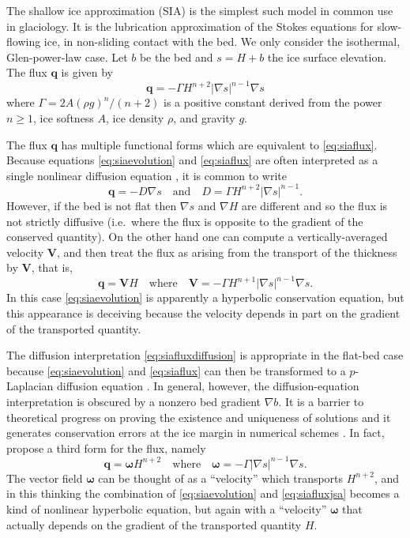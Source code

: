 \documentclass[twocolumn,letterpaper]{igs}
\newcommand\bq{\mathbf{q}}
\newcommand\bV{\mathbf{V}}
\newcommand{\grad}{\nabla}
\begin{document}
The shallow ice approximation (SIA) is the simplest such model in common use in glaciology.  It is the lubrication approximation \citep{Fowler1997} of the Stokes equations for slow-flowing ice, in non-sliding contact with the bed.  We only consider the isothermal, Glen-power-law \citep{GreveBlatter2009} case.  Let $b$ be the bed and $s = H+b$ the ice surface elevation.  The flux $\bq$ is given by
\begin{equation}
\bq = - \Gamma H^{n+2} |\grad s|^{n-1} \grad s  \label{eq:siaflux}
\end{equation}
where $\Gamma = 2 A (\rho g)^n / (n+2)$ is a positive constant derived from the power $n\ge 1$, ice softness $A$, ice density $\rho$, and gravity $g$.

The flux $\bq$ has multiple functional forms which are equivalent to \eqref{eq:siaflux}.  Because equations \eqref{eq:siaevolution} and \eqref{eq:siaflux} are often interpreted as a single nonlinear diffusion equation \citep{Huybrechtsetal1996}, it is common to write
\begin{equation}
\bq = - D \grad s \quad \text{and} \quad D =  \Gamma H^{n+2} |\grad s|^{n-1}. \label{eq:siafluxdiffusion}
\end{equation}
However, if the bed is not flat then $\grad s$ and $\grad H$ are different and so the flux is not strictly diffusive (i.e.~where the flux is opposite to the gradient of the conserved quantity).  On the other hand one can compute a vertically-averaged velocity $\bV$, and then treat the flux as arising from the transport of the thickness by $\bV$, that is,
\begin{equation}
\bq = \bV H \quad \text{where} \quad \bV = - \Gamma H^{n+1} |\grad s|^{n-1} \grad s. \label{eq:siafluxvelocity}
\end{equation}
In this case \eqref{eq:siaevolution} is apparently a hyperbolic conservation equation, but this appearance is deceiving because the velocity depends in part on the gradient of the transported quantity.

The diffusion interpretation \eqref{eq:siafluxdiffusion} is appropriate in the flat-bed case because \eqref{eq:siaevolution} and \eqref{eq:siaflux} can then be transformed to a $p$-Laplacian diffusion equation \citep{Calvoetal2002}.  In general, however, the diffusion-equation interpretation is obscured by a nonzero bed gradient $\grad b$.  It is a barrier to theoretical progress on proving the existence and uniqueness of solutions \citep{JouvetBueler2012} and it generates conservation errors at the ice margin in numerical schemes \citep{JaroschSchoofAnslow2013}.  In fact, \cite{JaroschSchoofAnslow2013} propose a third form for the flux, namely
\begin{equation}
   \bq = \boldsymbol{\omega} H^{n+2} \quad \text{where} \quad \boldsymbol{\omega} = - \Gamma |\grad s|^{n-1} \grad s. \label{eq:siafluxjsa}
\end{equation}
The vector field $\boldsymbol{\omega}$ can be thought of as a ``velocity'' which transports $H^{n+2}$, and in this thinking the combination of \eqref{eq:siaevolution} and \eqref{eq:siafluxjsa} becomes a kind of nonlinear hyperbolic equation, but again with a ``velocity'' $\boldsymbol{\omega}$ that actually depends on the gradient of the transported quantity $H$.
\end{document}
